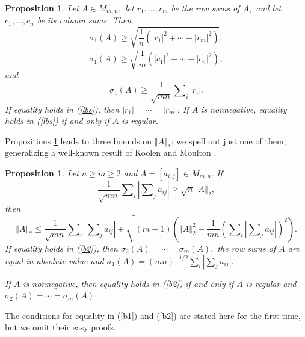 \documentclass[12pt]{article}%
\newtheorem{proposition}[theorem]{Proposition}
\begin{document}
\begin{proposition}
\label{lobos}Let $A\in M_{m,n},$ let $r_{1},\ldots,r_{m}$ be the row sums of
$A,$ and let $c_{1},\ldots,c_{n}$ be its column sums. Then
\[
\sigma_{1}\left(  A\right)  \geq\sqrt{\frac{1}{n}\left(  \left\vert
r_{1}\right\vert ^{2}+\cdots+\left\vert r_{m}\right\vert ^{2}\right)  },
\]%
\[
\sigma_{1}\left(  A\right)  \geq\sqrt{\frac{1}{m}\left(  \left\vert
c_{1}\right\vert ^{2}+\cdots+\left\vert c_{n}\right\vert ^{2}\right)  },
\]
and%
\begin{equation}
\sigma_{1}\left(  A\right)  \geq\frac{1}{\sqrt{mn}}\sum\nolimits_{i}\left\vert
r_{i}\right\vert . \label{lbs}%
\end{equation}
If equality holds in (\ref{lbs}), then $\left\vert r_{1}\right\vert
=\cdots=\left\vert r_{m}\right\vert $. If $A$ is nonnegative, equality holds
in (\ref{lbs}) if and only if $A$ is regular.
\end{proposition}

Propositions \ref{lobos} leads to three bounds on $\left\Vert A\right\Vert
_{\ast}$; we spell out just one of them, generalizing a well-known result of
Koolen and Moulton \cite{KoMo01}.

\begin{proposition}
\label{pronm}Let $n\geq m\geq2$ and $A=\left[  a_{i,j}\right]  \in M_{m,n}.$
If%
\[
\frac{1}{\sqrt{mn}}\sum\nolimits_{i}\left\vert \sum\nolimits_{j}%
a_{ij}\right\vert \geq\sqrt{n}\left\Vert A\right\Vert _{2},
\]
then
\begin{equation}
\left\Vert A\right\Vert _{\ast}\leq\frac{1}{\sqrt{mn}}\sum\nolimits_{i}%
\left\vert \sum\nolimits_{j}a_{ij}\right\vert +\sqrt{\left(  m-1\right)
\left(  \left\Vert A\right\Vert _{2}^{2}-\frac{1}{mn}\left(  \sum
\nolimits_{i}\left\vert \sum\nolimits_{j}a_{ij}\right\vert \right)
^{2}\right)  }. \label{b2}%
\end{equation}
If equality holds in (\ref{b2}), then $\sigma_{2}\left(  A\right)
=\cdots=\sigma_{m}\left(  A\right)  ,$ the row sums of $A$ are equal in
absolute value and $\sigma_{1}\left(  A\right)  =\left(  mn\right)
^{-1/2}\sum\nolimits_{i}\left\vert \sum\nolimits_{j}a_{ij}\right\vert .$

If $A$ is nonnegative, then equality holds in (\ref{b2}) if and only if $A$ is
regular and $\sigma_{2}\left(  A\right)  =\cdots=\sigma_{m}\left(  A\right)  $.
\end{proposition}

The conditions for equality in (\ref{b1}) and (\ref{b2}) are stated here for
the first time, but we omit their easy proofs.\medskip\ 
\end{document}

